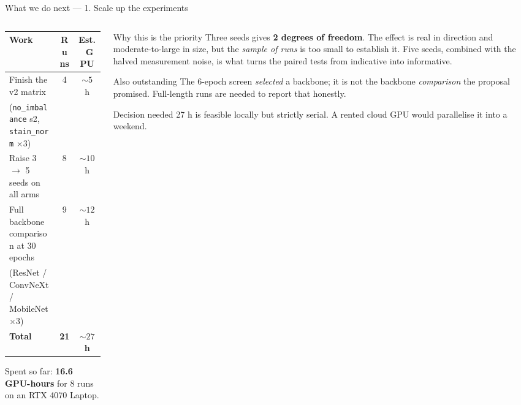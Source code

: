 \documentclass[aspectratio=169,11pt]{beamer}
\begin{document}
\begin{frame}{What we do next --- 1. Scale up the experiments}
  \begin{columns}[T]
    \begin{column}{0.55\textwidth}
      \scriptsize
      \begin{tabular}{@{}lcc@{}}
        \toprule
        \textbf{Work} & \textbf{Runs} & \textbf{Est.\ GPU} \\
        \midrule
        Finish the v2 matrix & 4 & ${\sim}5$ h \\
        \quad (\texttt{no\_imbalance} s2, \texttt{stain\_norm} $\times$3) & & \\
        Raise 3 $\rightarrow$ 5 seeds on all arms & 8 & ${\sim}10$ h \\
        Full backbone comparison at 30 epochs & 9 & ${\sim}12$ h \\
        \quad (ResNet / ConvNeXt / MobileNet $\times$3) & & \\
        \midrule
        \textbf{Total} & \textbf{21} & \textbf{${\sim}27$ h} \\
        \bottomrule
      \end{tabular}

      \medskip
      Spent so far: \textbf{16.6 GPU-hours} for 8 runs on an RTX 4070 Laptop.
    \end{column}
    \begin{column}{0.43\textwidth}
      \begin{block}{Why this is the priority}
        \scriptsize
        Three seeds gives \textbf{2 degrees of freedom}. The effect is real in
        direction and moderate-to-large in size, but the \emph{sample of runs}
        is too small to establish it. Five seeds, combined with the halved
        measurement noise, is what turns the paired tests from indicative into
        informative.
      \end{block}
      \begin{block}{Also outstanding}
        \scriptsize
        The 6-epoch screen \emph{selected} a backbone; it is not the backbone
        \emph{comparison} the proposal promised. Full-length runs are needed to
        report that honestly.
      \end{block}
      \begin{alertblock}{Decision needed}
        \scriptsize
        27 h is feasible locally but strictly serial. A rented cloud GPU would
        parallelise it into a weekend.
      \end{alertblock}
    \end{column}
  \end{columns}
\end{frame}
\end{document}
